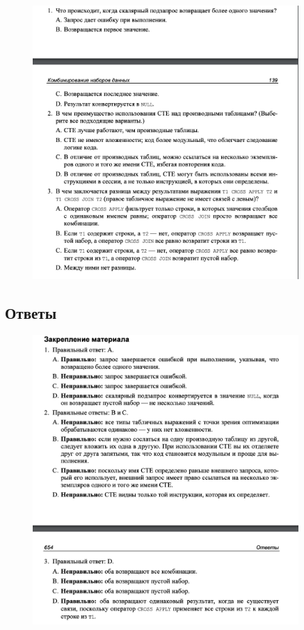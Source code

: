 \begin{figure}[h!]
	\begin{center}
		\includegraphics[width=0.9\textwidth]{img/zakrep9.png}
	\end{center}
	\captionsetup{justification=centering}
\end{figure}
\clearpage

\subsection*{Ответы}

\begin{figure}[h!]
	\begin{center}
		\includegraphics[width=0.9\textwidth]{img/ans9.png}
	\end{center}
	\captionsetup{justification=centering}
\end{figure}



